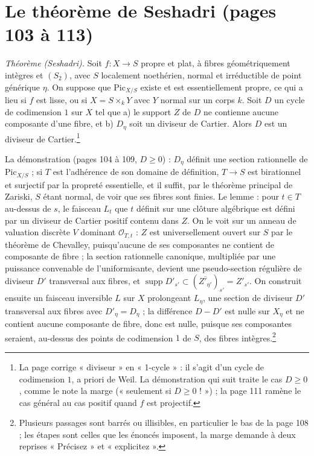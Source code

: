 \documentclass[11pt,a4paper]{article}
\begin{document}
\section*{Le théorème de Seshadri (pages 103 à 113)}

\emph{Théorème (Seshadri).} Soit $f \colon X \to S$ propre et plat, à fibres
géométriquement intègres et $(S_2)$, avec $S$ localement noethérien, normal et
irréductible de point générique $\eta$. On suppose que $\mathrm{Pic}_{X/S}$
existe et est essentiellement propre, ce qui a lieu si $f$ est lisse, ou si
$X = S \times_k Y$ avec $Y$ normal sur un corps $k$. Soit $D$ un cycle de
codimension $1$ sur $X$ tel que a) le support $Z$ de $D$ ne contienne aucune
composante d'une fibre, et b) $D_\eta$ soit un diviseur de Cartier. Alors $D$
est un diviseur de Cartier.\footnote{La page corrige « diviseur » en
« 1-cycle » : il s'agit d'un cycle de codimension $1$, a priori de Weil. La
démonstration qui suit traite le cas $D \geq 0$, comme le note la marge
(« seulement si $D \geq 0$ ! ») ; la page 111 ramène le cas général au cas
positif quand $f$ est projectif.}

La démonstration (pages 104 à 109, $D \geq 0$) : $D_\eta$ définit une section
rationnelle de $\mathrm{Pic}_{X/S}$ ; si $T$ est l'adhérence de son domaine
de définition, $T \to S$ est birationnel et surjectif par la propreté
essentielle, et il suffit, par le théorème principal de Zariski, $S$ étant
normal, de voir que ses fibres sont finies. Le lemme : pour $t \in T$ au-dessus
de $s$, le faisceau $L_t$ que $t$ définit sur une clôture algébrique est
défini par un diviseur de Cartier positif contenu dans $Z$. On le voit sur un
anneau de valuation discrète $V$ dominant $\mathcal{O}_{T,t}$ : $Z$ est
universellement ouvert sur $S$ par le théorème de Chevalley, puisqu'aucune de
ses composantes ne contient de composante de fibre ; la section rationnelle
canonique, multipliée par une puissance convenable de l'uniformisante, devient
une pseudo-section régulière de diviseur $D'$ transversal aux fibres, et
$\operatorname{supp} D'_{s'} \subset (\overline{Z'_{\eta'}})_{s'} = Z'_{s'}$.
On construit ensuite un faisceau inversible $L$ sur $X$ prolongeant
$L_\eta$, une section de diviseur $D'$ transversal aux fibres avec
$D'_\eta = D_\eta$ ; la différence $D - D'$ est nulle sur $X_\eta$ et ne
contient aucune composante de fibre, donc est nulle, puisque ses composantes
seraient, au-dessus des points de codimension $1$ de $S$, des fibres
intègres.\footnote{Plusieurs passages sont barrés ou illisibles, en
particulier le bas de la page 108 ; les étapes sont celles que les énoncés
imposent, la marge demande à deux reprises « Précisez » et « explicitez ».}
\end{document}
